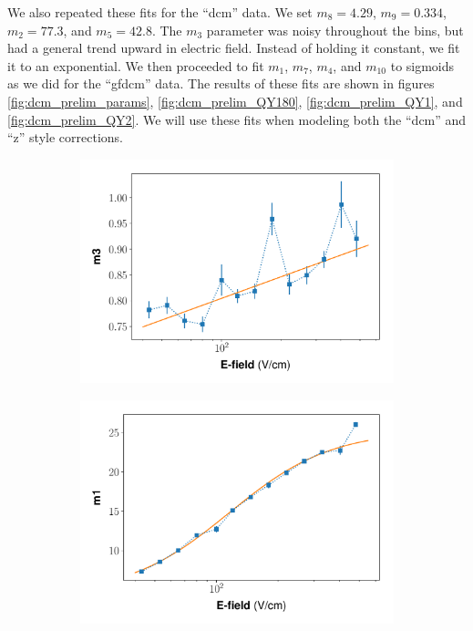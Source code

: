 We also repeated these fits for the ``dcm'' data. We set $m_8=4.29$, $m_9= 0.334$, $m_2=77.3$, and $m_5=42.8$. The $m_3$ parameter was noisy throughout the bins, but had a general trend upward in electric field. Instead of holding it constant, we fit it to an exponential. We then proceeded to fit $m_1$, $m_7$, $m_4$, and $m_{10}$ to sigmoids as we did for the ``gfdcm'' data.  The results of these fits are shown in figures \ref{fig:dcm_prelim_params}, \ref{fig:dcm_prelim_QY180}, \ref{fig:dcm_prelim_QY1}, and \ref{fig:dcm_prelim_QY2}. We will use these fits when modeling both the ``dcm'' and ``z'' style corrections.
\begin{figure}[h!]
\centering
\begin{subfigure}{0.45\textwidth}
  \centering
  \includegraphics[width=\textwidth]{Figures/Yields_fit_old/NEST_m3_fit_old_dcm.pdf}
  \caption{}
\end{subfigure}%
\begin{subfigure}{0.45\textwidth}
  \centering
  \includegraphics[width=\textwidth]{Figures/Yields_fit_old/NEST_m1_fit_old_dcm.pdf}

\end{subfigure}
\end{figure}
